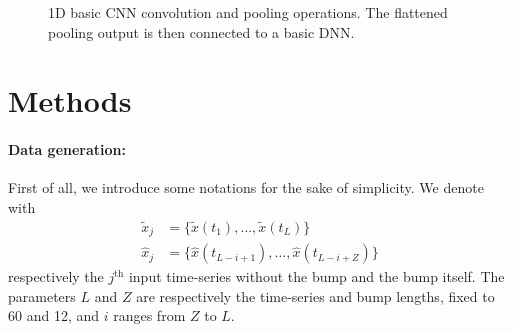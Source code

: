 \documentclass[prl,twocolumn]{revtex4-1}
\newcommand{\figref}[1]{FIG. \ref{#1}}
\begin{document}

\begin{figure}[!h]
    \centering
    
    \caption{1D basic CNN convolution and pooling operations. The flattened pooling output is then connected to a basic DNN.}
    \label{fig:I_CNN_1D}
\end{figure}




\section{Methods}
\paragraph{\bf Data generation:}
First of all, we introduce some notations for the sake of simplicity. We denote with
\begin{align}
    \tilde{x}_j &=  \{ \tilde{x}(t_{1}), \dots, \tilde{x}(t_{L}) \}   \label{eq:x_tilde}  \\
    \hat{x}_j   &=  \{ \hat{x}(t_{L-i+1}), \dots, \hat{x}(t_{L-i+Z}) \}   \label{eq:x_hat}
\end{align}
respectively the $j^{\text{th}}$ input time-series without the bump and the bump itself. The parameters $L$ and $Z$ are respectively the time-series and bump lengths, fixed to 60 and 12, and $i$ ranges from $Z$ to $L$.
\end{document}

